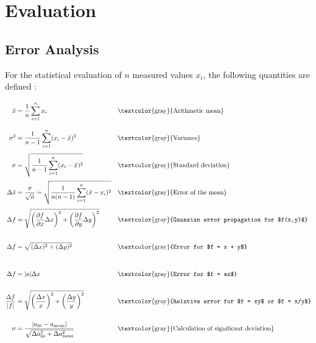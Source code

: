 \onecolumn
\chapter{Evaluation}
\section*{Error Analysis}
For the statistical evaluation of $n$ measured values $x_i$, the following quantities are defined \cite{errorSkript25}:
\begin{align}
    \bar{x} &= \frac{1}{n} \sum_{i=1}^{n} x_i \vphantom{\sqrt{\sum_i^n}^2} && \text{\textcolor{gray}{Arithmetic mean}} \label{eq:arithmetisches_mittel} \\
    \sigma^2 &= \frac{1}{n-1} \sum_{i=1}^{n} (x_i - \bar{x})^2 \vphantom{\sqrt{\sum_i^n}^2} && \text{\textcolor{gray}{Variance}} \label{eq:variation} \\
    \sigma &= \sqrt{\frac{1}{n-1} \sum_{i=1}^{n} (x_i - \bar{x})^2} \vphantom{\sqrt{\sum_i^n}^2} && \text{\textcolor{gray}{Standard deviation}} \label{eq:standardabweichung} \\
    \Delta \bar{x} &= \frac{\sigma}{\sqrt{n}} = \sqrt{\frac{1}{n(n-1)} \sum_{i=1}^n(\bar x - x_i)^2} \vphantom{\sqrt{\sum_i^n}^2} && \text{\textcolor{gray}{Error of the mean}} \label{eq:fehler_mittelwert} \\
    \Delta f &= \sqrt{\left(\frac{\partial f}{\partial x} \Delta x\right)^2 + \left(\frac{\partial f}{\partial y} \Delta y\right)^2} \vphantom{\sqrt{\sum_i^n}^2} && \text{\textcolor{gray}{Gaussian error propagation for $f(x,y)$}} \label{eq:gauss_fehlfortpflanzung} \\
    \Delta f &= \sqrt{(\Delta x)^2 + (\Delta y)^2} \vphantom{\sqrt{\sum_i^n}^2} && \text{\textcolor{gray}{Error for $f = x + y$}} \label{eq:fehler_summe} \\
    \Delta f &= |a| \Delta x \vphantom{\sqrt{\sum_i^n}^2} && \text{\textcolor{gray}{Error for $f = ax$}} \label{eq:fehler_proportional} \\
    \frac{\Delta f}{|f|} &= \sqrt{\left(\frac{\Delta x}{x}\right)^2 + \left(\frac{\Delta y}{y}\right)^2} \vphantom{\sqrt{\sum_i^n}^2} && \text{\textcolor{gray}{Relative error for $f = xy$ or $f = x/y$}} \label{eq:relativer_fehler} \\
    \sigma &= \frac{|a_\text{lit} - a_\text{meas}|}{\sqrt{\Delta a_\text{lit}^2 + \Delta a_\text{meas}^2}} \vphantom{\sqrt{\sum_i^n}^2} && \text{\textcolor{gray}{Calculation of significant deviation}} \label{eq:signifikante_abweichung}
\end{align}

